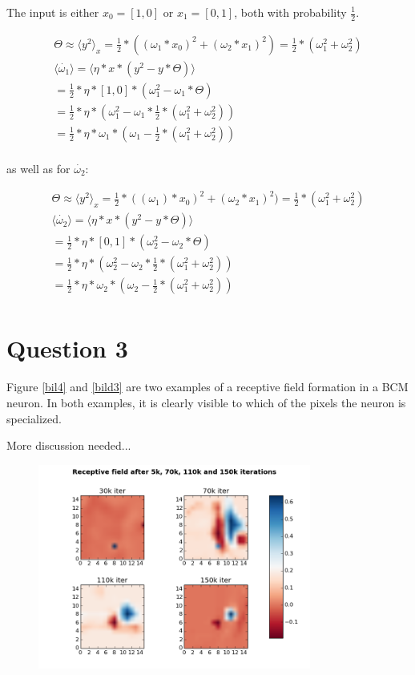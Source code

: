 The input is either $x_0 = [1, 0]$ or $x_1 = [0, 1]$, both with probability $\frac{1}{2}$.

\begin{align*}
	\Theta \approx \langle y^2 \rangle_x = \frac{1}{2} * ((\omega_1 * x_0)^2 + (\omega_2 * x_1)^2) = \frac{1}{2} * (\omega_1^2 + \omega_2^2) \\
	\langle \dot{\omega_1} \rangle = \langle \eta * x * (y^2 - y * \Theta) \rangle \\
	= \frac{1}{2} * \eta * [1, 0] * (\omega_1^2 - \omega_1 * \Theta) \\
	= \frac{1}{2} * \eta * (\omega_1^2 - \omega_1 * \frac{1}{2} * (\omega_1^2 + \omega_2^2)) \\
	= \frac{1}{2} * \eta * \omega_1 * (\omega_1 - \frac{1}{2} * (\omega_1^2 + \omega_2^2)) \\
\end{align*}

as well as for $\dot{\omega_2}$:

\begin{align*}
	\Theta \approx \langle y^2 \rangle_x = \frac{1}{2} * ((\omega_1) * x_0)^2 + (\omega_2 * x_1)^2) = \frac{1}{2} * (\omega_1^2 + \omega_2^2) \\
	\langle \dot{\omega_2} \rangle = \langle \eta * x * (y^2 - y * \Theta) \rangle \\
	= \frac{1}{2} * \eta * [0, 1] * (\omega_2^2 - \omega_2 * \Theta) \\
	= \frac{1}{2} * \eta * (\omega_2^2 - \omega_2 * \frac{1}{2} * (\omega_1^2 + \omega_2^2)) \\
	= \frac{1}{2} * \eta * \omega_2 * (\omega_2 - \frac{1}{2} * (\omega_1^2 + \omega_2^2)) \\
\end{align*}

\section{Question 3}

Figure \ref{bil4} and \ref{bild3} are two examples of a receptive field formation in a BCM neuron. In both examples, it is clearly visible to which of the pixels the neuron is specialized.

More discussion needed...

\begin{figure}[H]
 \centering
 \includegraphics[width = 0.8\textwidth]{../results/exercise3b}
 \caption{}
 \label{fig:bild3}
\end{figure}

